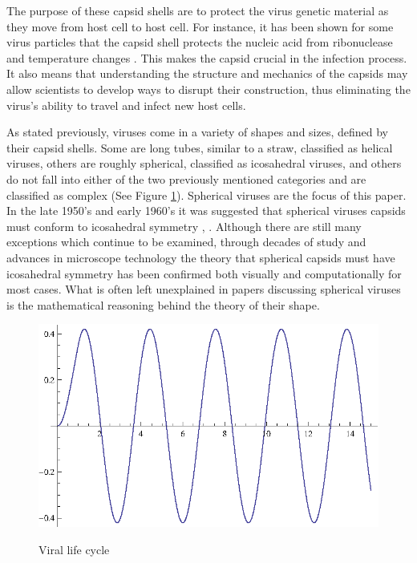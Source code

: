 \documentclass[12pt,letter]{article}
\begin{document}
The purpose of these capsid shells are to protect the virus genetic material as they move from host cell to host cell. For instance, it has been shown for some virus particles that the capsid shell protects the nucleic acid from ribonuclease and temperature changes \cite[p 5]{Caspar:1962}. This makes the capsid crucial in the infection process. It also means that understanding the structure and mechanics of the capsids may allow scientists to develop ways to disrupt their construction, thus eliminating the virus's ability to travel and infect new host cells. 

As stated previously, viruses come in a variety of shapes and sizes, defined by their capsid shells. Some are long tubes, similar to a straw, classified as helical viruses, others are roughly spherical, classified as icosahedral viruses, and others do not fall into either of the two previously mentioned categories and are classified as complex (See Figure \ref{fig:virus_types}). Spherical viruses are the focus of this paper. In the late 1950's and early 1960's it was suggested that spherical viruses capsids must conform to icosahedral symmetry \cite{Crick:1956}, \cite{Caspar:1962}. Although there are still many exceptions which continue to be examined, through decades of study and advances in microscope technology the theory that spherical capsids must have icosahedral symmetry has been confirmed both visually and computationally for most cases. What is often left unexplained in papers discussing spherical viruses is the mathematical reasoning behind the theory of their shape.

\begin{figure}[h]
	\caption{Viral life cycle}
	\centering
	\includegraphics{place_holder.eps}
	\label{fig:virus_types}
\end{figure}
\end{document}
